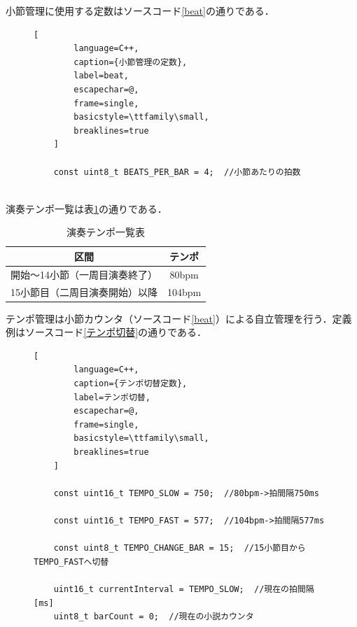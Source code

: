 \documentclass[lualatex,book,paper=a4paper,jafontsize=11.5pt,jafontscale=1.05,oneside]{jlreq}
\begin{document}
小節管理に使用する定数はソースコード\ref{beat}の通りである．
\begin{figure}[H]
\renewcommand{\lstlistingname}{ソースコード}
    \begin{lstlisting}[
        language=C++,
        caption={小節管理の定数},
        label=beat,
        escapechar=@,
        frame=single,
        basicstyle=\ttfamily\small,
        breaklines=true
    ]
    
    const uint8_t BEATS_PER_BAR = 4;  //小節あたりの拍数
    
   \end{lstlisting}
\end{figure}

演奏テンポ一覧は表\ref{temp}の通りである．

\begin{table}[h]
  \centering
  \caption{演奏テンポ一覧表}
  \label{temp}
  \begin{tabular}{|c|c|}
\hline
区間 & テンポ  \\\hline \hline
開始〜14小節（一周目演奏終了） & 80bpm \\ \hline
15小節目（二周目演奏開始）以降 & 104bpm  \\ \hline

  \end{tabular}  
\end{table}
\FloatBarrier

テンポ管理は小節カウンタ（ソースコード\ref{beat}）による自立管理を行う．定義例はソースコード\ref{テンポ切替}の通りである．
\begin{figure}[H]
\renewcommand{\lstlistingname}{ソースコード}
    \begin{lstlisting}[
        language=C++,
        caption={テンポ切替定数},
        label=テンポ切替,
        escapechar=@,
        frame=single,
        basicstyle=\ttfamily\small,
        breaklines=true
    ]
    
    const uint16_t TEMPO_SLOW = 750;  //80bpm->拍間隔750ms
    
    const uint16_t TEMPO_FAST = 577;  //104bpm->拍間隔577ms
    
    const uint8_t TEMPO_CHANGE_BAR = 15;  //15小節目からTEMPO_FASTへ切替
    
    uint16_t currentInterval = TEMPO_SLOW;  //現在の拍間隔[ms]
    uint8_t barCount = 0;  //現在の小説カウンタ
    
   \end{lstlisting}
\end{figure}
\end{document}
